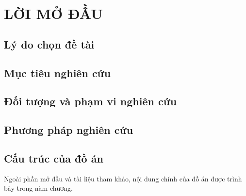 \chapter*{LỜI MỞ ĐẦU}

\section{Lý do chọn đề tài}



\section{Mục tiêu nghiên cứu}


\section{Đối tượng và phạm vi nghiên cứu}


\section{Phương pháp nghiên cứu}


\section{Cấu trúc của đồ án}

Ngoài phần mở đầu và tài liệu tham khảo, nội dung chính của đồ án được trình bày trong năm chương.
